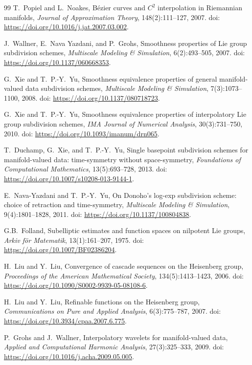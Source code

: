 \documentclass{article}
\theoremstyle{plain}
\theoremstyle{definition}
\begin{document}
\begin{thebibliography}{99}
T.\ Popiel and L.\ Noakes,
B\'{e}zier curves and $C^2$ interpolation in Riemannian manifolds,
\textit{Journal of Approximation Theory}, 148(2):111--127, 2007.
doi: \url{https://doi.org/10.1016/j.jat.2007.03.002}.

J.\ Wallner, E.\ Nava Yazdani, and P.\ Grohs,
Smoothness properties of Lie group subdivision schemes,
\textit{Multiscale Modeling \& Simulation}, 6(2):493--505, 2007.
doi: \url{https://doi.org/10.1137/060668353}.

G.\ Xie and T.\ P.-Y.\ Yu,
Smoothness equivalence properties of general manifold-valued data subdivision
schemes,
\textit{Multiscale Modeling \& Simulation}, 7(3):1073--1100, 2008.
doi: \url{https://doi.org/10.1137/080718723}.

G.\ Xie and T.\ P.-Y.\ Yu,
Smoothness equivalence properties of interpolatory Lie group subdivision schemes,
\textit{IMA Journal of Numerical Analysis}, 30(3):731--750, 2010.
doi: \url{https://doi.org/10.1093/imanum/drn065}.

T.\ Duchamp, G.\ Xie, and T.\ P.-Y.\ Yu,
Single basepoint subdivision schemes for manifold-valued data:
time-symmetry without space-symmetry,
\textit{Foundations of Computational Mathematics}, 13(5):693--728, 2013.
doi: \url{https://doi.org/10.1007/s10208-013-9144-1}.

E.\ Nava-Yazdani and T.\ P.-Y.\ Yu,
On Donoho's log-exp subdivision scheme: choice of retraction and time-symmetry,
\textit{Multiscale Modeling \& Simulation}, 9(4):1801--1828, 2011.
doi: \url{https://doi.org/10.1137/100804838}.

G.B.\ Folland,
Subelliptic estimates and function spaces on nilpotent Lie groups,
\textit{Arkiv f\"{o}r Matematik}, 13(1):161--207, 1975.
doi: \url{https://doi.org/10.1007/BF02386204}.

H.\ Liu and Y.\ Liu,
Convergence of cascade sequences on the Heisenberg group,
\textit{Proceedings of the American Mathematical Society}, 134(5):1413--1423, 2006.
doi: \url{https://doi.org/10.1090/S0002-9939-05-08108-6}.

H.\ Liu and Y.\ Liu,
Refinable functions on the Heisenberg group,
\textit{Communications on Pure and Applied Analysis}, 6(3):775--787, 2007.
doi: \url{https://doi.org/10.3934/cpaa.2007.6.775}.

P.\ Grohs and J.\ Wallner,
Interpolatory wavelets for manifold-valued data,
\textit{Applied and Computational Harmonic Analysis}, 27(3):325--333, 2009.
doi: \url{https://doi.org/10.1016/j.acha.2009.05.005}.


\end{thebibliography}
\end{document}
